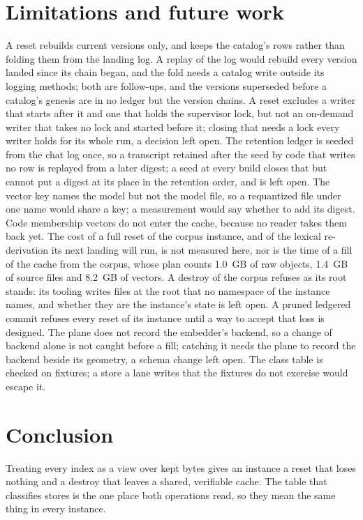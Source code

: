 \documentclass[11pt]{article}
\theoremstyle{plain}
\theoremstyle{definition}
\theoremstyle{remark}
\begin{document}
\section{Limitations and future work}

A reset rebuilds current versions only, and keeps the catalog's rows rather than folding them from
the landing log. A replay of the log would rebuild every version landed since its chain began, and
the fold needs a catalog write outside its logging methods; both are follow-ups, and the versions
superseded before a catalog's genesis are in no ledger but the version chains. A reset excludes a
writer that starts after it and one that holds the supervisor lock, but not an on-demand writer
that takes no lock and started before it; closing that needs a lock every writer holds for its
whole run, a decision left open. The retention ledger is seeded from the chat log once, so a
transcript retained after the seed by code that writes no row is replayed from a later digest;
a seed at every build closes that but cannot put a digest at its place in the retention order,
and is left open. The vector key
names the model but not the model file, so a requantized file under one name would share a key; a
measurement would say whether to add its digest. Code membership vectors do not enter the cache,
because no reader takes them back yet. The cost of a full reset of the corpus instance, and of the
lexical re-derivation its next landing will run, is not measured here, nor is the time of a fill
of the cache from the corpus, whose plan counts 1.0~GB of raw objects, 1.4~GB of source files and
8.2~GB of vectors. A destroy of the corpus refuses as its root stands: its tooling writes files at
the root that no namespace of the instance names, and whether they are the instance's state is
left open. A pruned ledgered commit
refuses every reset of its instance until a way to accept that loss is designed. The plane does not
record the embedder's backend, so a change of backend alone is not caught before a fill; catching
it needs the plane to record the backend beside its geometry, a schema change left open. The class
table is checked on fixtures; a store a lane writes that the fixtures do not exercise would escape it.

\section{Conclusion}

Treating every index as a view over kept bytes gives an instance a reset that loses nothing and a
destroy that leaves a shared, verifiable cache. The table that classifies stores is the one place
both operations read, so they mean the same thing in every instance.



\end{document}
